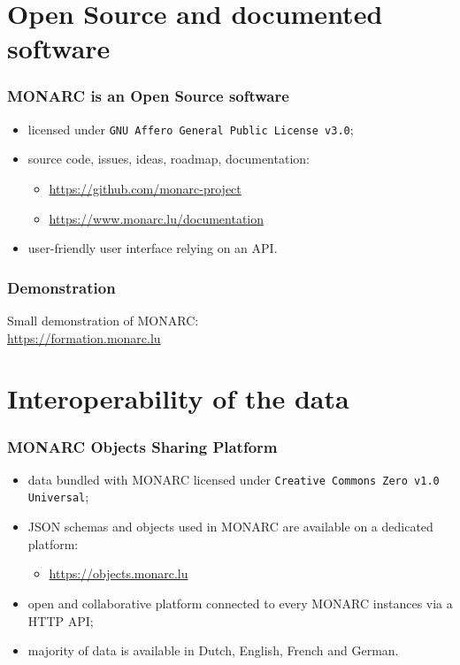 \documentclass[]{beamer}
\begin{document}
\section{Open Source and documented software}
\begin{frame}
  \frametitle{MONARC is an Open Source software}
  \begin{center}
    \begin{itemize}
      \item licensed under \texttt{GNU Affero General Public License v3.0};
      \item source code, issues, ideas, roadmap, documentation:
        \begin{itemize}
            \item \url{https://github.com/monarc-project}
            \item \url{https://www.monarc.lu/documentation}
        \end{itemize}
      \item user-friendly user interface relying on an API.
    \end{itemize}
  \end{center}
\end{frame}

\begin{frame}
  \frametitle{Demonstration}
  Small demonstration of MONARC:\\
  \url{https://formation.monarc.lu}
\end{frame}


\section{Interoperability of the data}
\begin{frame}
  \frametitle{MONARC Objects Sharing Platform}
  \begin{center}
    \begin{itemize}
      \item data bundled with MONARC licensed under \texttt{Creative Commons Zero v1.0 Universal};
      \item JSON schemas and objects used in MONARC are available on a dedicated platform:\\
        \begin{itemize}
            \item \url{https://objects.monarc.lu}
        \end{itemize}
      \item open and collaborative platform connected to every MONARC instances via a HTTP API;
      \item majority of data is available in Dutch, English, French and German.
    \end{itemize}
  \end{center}
\end{frame}
\end{document}
